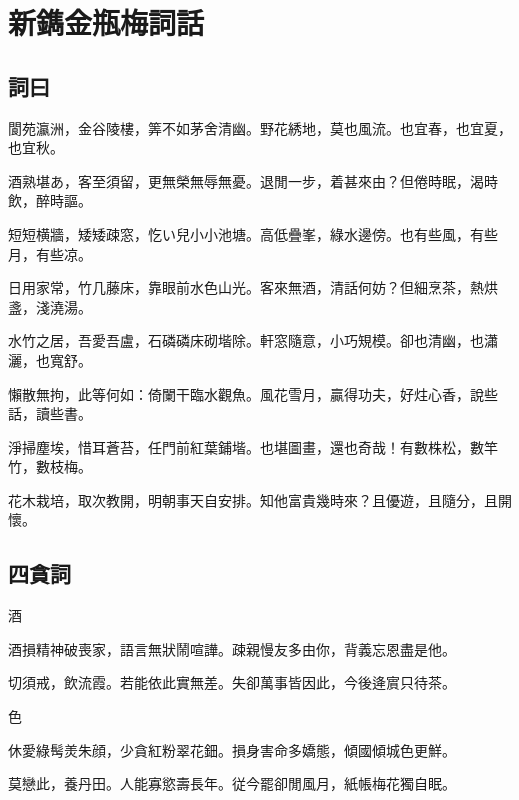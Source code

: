 \chapter*{新鐫金瓶梅詞話}


\section*{詞曰}

\begin{myquote0}
閬苑瀛洲，金谷陵樓，筭不如茅舍清幽。野花綉地，莫也風流。也宜春，也宜夏，也宜秋。

酒熟堪あ，客至須留，更無榮無辱無憂。退閒一步，着甚來由？但倦時眠，渴時飲，醉時謳。

短短横牆，矮矮疎窓，忔い兒小小池塘。高低疊峯，綠水邊傍。也有些風，有些月，有些凉。

日用家常，竹几藤床，靠眼前水色山光。客來無酒，清話何妨？但細烹茶，熱烘盞，淺澆湯。

水竹之居，吾愛吾盧，石磷磷床砌堦除。軒窓隨意，小巧䂓模。卻也清幽，也瀟灑，也寬舒。

懶散無拘，此等何如：倚闌干臨水觀魚。風花雪月，贏得功夫，好炷心香，說些話，讀些書。

淨掃塵埃，惜耳蒼苔，任門前紅葉鋪堦。也堪圖畫，還也奇哉！有數株松，數竿竹，數枝梅。

花木栽培，取次教開，明朝事天自安排。知他富貴幾時來？且優遊，且隨分，且開懷。
\end{myquote0}

\newpage\section*{四貪詞}

\hspace*{1em}酒

\begin{myquote0}
酒損精神破喪家，語言無狀鬧喧譁。疎親慢友多由你，背義忘恩盡是他。

切須戒，飲流霞。若能依此實無差。失卻萬事皆因此，今後逄賔只待茶。
\end{myquote0}

\hspace*{1em}色

\begin{myquote0}
休愛綠髩羙朱顔，少貪紅粉翠花鈿。損身害命多嬌態，傾國傾城色更鮮。

莫戀此，養丹田。人能寡慾壽長年。従今罷卻閒風月，紙帳梅花獨自眠。
\end{myquote0}

